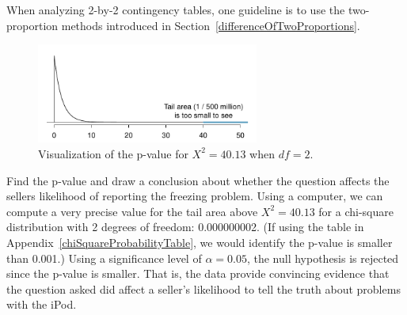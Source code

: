 When analyzing 2-by-2 contingency tables, one guideline
is to use the two-proportion methods introduced in
Section~\ref{differenceOfTwoProportions}.

\begin{figure}[h]
\centering
\includegraphics[width=0.65\textwidth]{ch_inference_for_props/figures/iPodChiSqTail/iPodChiSqTail}
\caption{Visualization of the p-value for $X^2 = 40.13$
    when $df = 2$.}
\label{iPodChiSqTail}
\end{figure}

\begin{examplewrap}
\begin{nexample}{Find the p-value and draw a conclusion
    about whether the question affects the sellers likelihood
    of reporting the freezing problem.}
  Using a computer, we can compute a very precise value
  for the tail area above $X^2 = 40.13$ for a chi-square
  distribution with 2 degrees of freedom:
  0.000000002.
  (If using the table in
    Appendix~\ref{chiSquareProbabilityTable},
    we would identify the p-value is smaller
    than 0.001.)
  Using a significance level of $\alpha=0.05$,
  the null hypothesis is rejected since the p-value is smaller.
  That is, the data provide convincing evidence that the
  question asked did affect a seller's likelihood to tell
  the truth about problems with the iPod.
\end{nexample}
\end{examplewrap}




